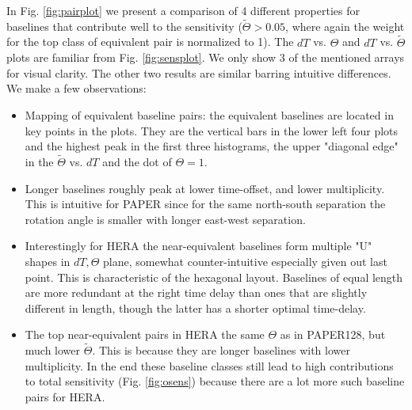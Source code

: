 \documentclass[twocolumn,apj,numberedappendix]{emulateapj}
\renewcommand\[{\begin{equation}}
\renewcommand\]{\end{equation}}
\begin{document}
In Fig. \ref{fig:pairplot} we present a comparison of 4 different properties for baselines that contribute well to the sensitivity ($\widetilde{\Theta}>0.05$, where again the weight for the top class of equivalent pair is normalized to 1). The $dT$ vs. $\Theta$ and $dT$ vs. $\widetilde{\Theta}$ plots are familiar from Fig. \ref{fig:sensplot}. We only show 3 of the mentioned arrays for visual clarity. The other two results are similar barring intuitive differences. We make a few observations:
\begin{itemize}

\item Mapping of equivalent baseline pairs: the equivalent baselines are located in key points in the plots. They are the vertical bars in the lower left four plots and the highest peak in the first three histograms, the upper "diagonal edge" in the $\widetilde{\Theta}$ vs. $dT$ and the dot of $\Theta=1$. 


\item Longer baselines roughly peak at lower time-offset, and lower multiplicity. This is intuitive for PAPER since  for the same north-south separation the rotation angle is smaller with longer east-west separation. 

\item Interestingly for HERA the near-equivalent baselines form multiple "U" shapes in $dT, \Theta$ plane, somewhat counter-intuitive especially given out last point. This is characteristic of the hexagonal layout. Baselines of equal length are more redundant at the right time delay than ones that are slightly different in length, though the latter has a shorter optimal time-delay. 
 
\item The top near-equivalent pairs in HERA the same $\Theta$ as in PAPER128, but much lower $\widetilde{\Theta}$. This is because they are longer baselines with lower multiplicity. In the end these baseline classes still lead to high contributions to total sensitivity (Fig. \ref{fig:osens}) because there are a lot more such baseline pairs for HERA.  




\end{itemize}






\end{document}
